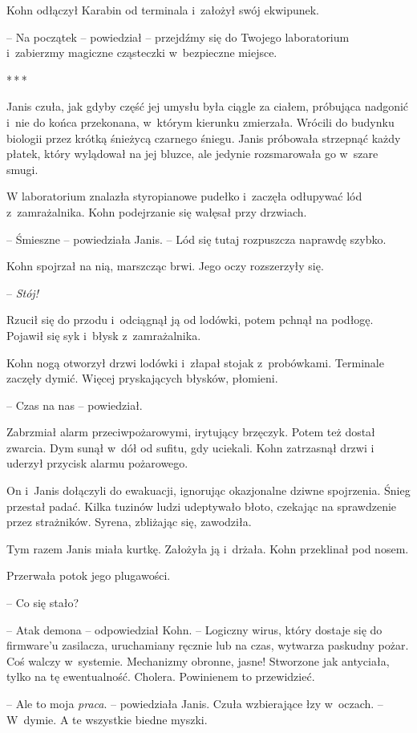 \documentclass[oneside,polish,11pt,sfheadings]{mwbk}
\newcommand{\threeast}{\bigskip\par\centerline{*\,*\,*}\medskip\par}%
\begin{document}
Kohn odłączył Karabin od terminala i~założył swój ekwipunek.

-- Na początek -- powiedział -- przejdźmy się do Twojego laboratorium i~zabierzmy magiczne cząsteczki w~bezpieczne miejsce.

\threeast

Janis czuła, jak gdyby część jej umysłu była ciągle za ciałem, próbująca
nadgonić i~nie do końca przekonana, w~którym kierunku zmierzała. Wrócili
do budynku biologii przez krótką śnieżycą czarnego śniegu. Janis
próbowała strzepnąć każdy płatek, który wylądował na jej bluzce, ale
jedynie rozsmarowała go w~szare smugi.

W laboratorium znalazła styropianowe pudełko i~zaczęła odłupywać lód z~zamrażalnika. Kohn podejrzanie się wałęsał przy drzwiach.

-- Śmieszne -- powiedziała Janis. -- Lód się tutaj rozpuszcza naprawdę
szybko.

Kohn spojrzał na nią, marszcząc brwi. Jego oczy rozszerzyły się.

-- \emph{Stój!}

Rzucił się do przodu i~odciągnął ją od lodówki, potem pchnął na podłogę.
Pojawił się syk i~błysk z~zamrażalnika.

Kohn nogą otworzył drzwi lodówki i~złapał stojak z~probówkami. Terminale
zaczęły dymić. Więcej pryskających błysków, płomieni.

-- Czas na nas -- powiedział.

Zabrzmiał alarm przeciwpożarowymi, irytujący brzęczyk. Potem też dostał
zwarcia. Dym sunął w~dół od sufitu, gdy uciekali. Kohn zatrzasnął drzwi
i uderzył przycisk alarmu pożarowego.

On i~Janis dołączyli do ewakuacji, ignorując okazjonalne dziwne
spojrzenia. Śnieg przestał padać. Kilka tuzinów ludzi udeptywało błoto,
czekając na sprawdzenie przez strażników. Syrena, zbliżając się,
zawodziła.

Tym razem Janis miała kurtkę. Założyła ją i~drżała. Kohn przeklinał pod
nosem.

Przerwała potok jego plugawości. 

-- Co się stało?

-- Atak demona -- odpowiedział Kohn. -- Logiczny wirus, który dostaje się
do firmware'u zasilacza, uruchamiany ręcznie lub na czas, wytwarza
paskudny pożar. Coś walczy w~systemie. Mechanizmy obronne, jasne!
Stworzone jak antyciała, tylko na tę ewentualność. Cholera. Powinienem
to przewidzieć.

-- Ale to moja \emph{praca}. -- powiedziała Janis. Czuła wzbierające łzy w~oczach. -- W~dymie. A te wszystkie biedne myszki.
\end{document}
